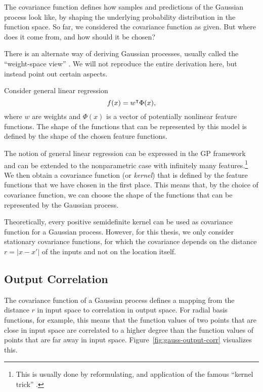 The covariance function defines how samples and predictions of the Gaussian
process look like, by shaping the underlying probability distribution in the
function space. So far, we considered the covariance function as given. But
where does it come from, and how should it be chosen?

There is an alternate way of deriving Gaussian processes, usually called the
``weight-space view'' \cite[\ts~2.1]{Rasmussen.Williams:2006:Gaussian}. We will
not reproduce the entire derivation here, but instead point out certain
aspects.

Consider general linear regression
\begin{equation}
  f(x) = w^{\intercal}\Phi(x),
\end{equation}
where $w$ are weights and $\Phi(x)$ is a vector of potentially nonlinear feature
functions. The shape of the functions that can be represented by this
model is defined by the shape of the chosen feature functions.

The notion of general linear regression can be expressed in the GP framework
and can be extended to the nonparametric case with infinitely many
features.\footnote{This is usually done by reformulating, and application of the
famous ``kernel trick''
.} We then obtain a covariance function (or
\emph{kernel}) that is defined by the feature functions that we have chosen in
the first place. This means that, by the choice of covariance function, we can
choose the shape of the functions that can be represented by the Gaussian
process.

Theoretically, every positive semidefinite kernel can be used as covariance
function for a Gaussian process. However, for this thesis, we only consider
stationary covariance functions, for which the covariance depends on the
distance $r=|x-x'|$ of the inputs and not on the location itself.

\subsection{Output Correlation}

The covariance function of a Gaussian process defines a mapping from the
distance $r$ in input space to correlation in output space. For radial basis
functions, for example, this means that the function values of two points that
are close in input space are correlated to a higher degree than the function
values of points that are far away in input space.
Figure~\ref{fig:gauss-output-corr} visualizes this.

